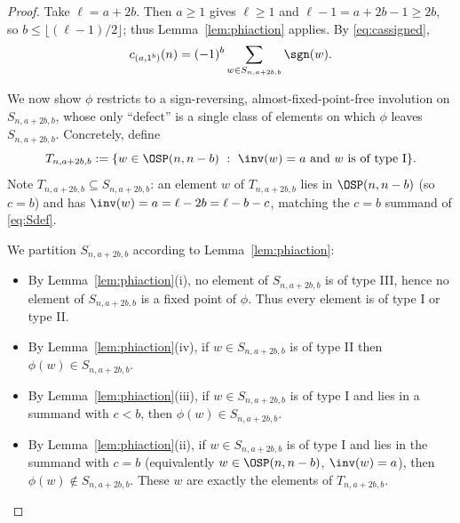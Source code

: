 \begin{proof}
Take $\ell=a+2b$. Then $a\ge1$ gives $\ell\ge1$ and $\ell-1=a+2b-1\ge 2b$, so
$b\le\lfloor(\ell-1)/2\rfloor$; thus Lemma~\ref{lem:phiaction} applies. By
\eqref{eq:cassigned},
\begin{equation}\label{eq:signedsum}
c_{(a,1^b)}(n)=(-1)^b\sum_{w\in S_{n,a+2b,b}}\sgn(w).
\end{equation}

We now show $\phi$ restricts to a sign-reversing, almost-fixed-point-free involution on
$S_{n,a+2b,b}$, whose only ``defect'' is a single class of elements on which $\phi$ leaves
$S_{n,a+2b,b}$. Concretely, define
\begin{equation}\label{eq:Tdef}
T_{n,a+2b,b}:=\{w\in\OSP(n,n-b)\ :\ \inv(w)=a\ \text{and}\ w\ \text{is of type I}\}.
\end{equation}
Note $T_{n,a+2b,b}\subseteq S_{n,a+2b,b}$: an element $w$ of $T_{n,a+2b,b}$ lies in
$\OSP(n,n-b)$ (so $c=b$) and has $\inv(w)=a=\ell-2b=\ell-b-c$, matching the $c=b$ summand of
\eqref{eq:Sdef}.

We partition $S_{n,a+2b,b}$ according to Lemma~\ref{lem:phiaction}:
\begin{itemize}
\item By Lemma~\ref{lem:phiaction}(i), no element of $S_{n,a+2b,b}$ is of type III, hence no
element of $S_{n,a+2b,b}$ is a fixed point of $\phi$. Thus every element is of type I or
type II.
\item By Lemma~\ref{lem:phiaction}(iv), if $w\in S_{n,a+2b,b}$ is of type II then
$\phi(w)\in S_{n,a+2b,b}$.
\item By Lemma~\ref{lem:phiaction}(iii), if $w\in S_{n,a+2b,b}$ is of type I and lies in a
summand with $c<b$, then $\phi(w)\in S_{n,a+2b,b}$.
\item By Lemma~\ref{lem:phiaction}(ii), if $w\in S_{n,a+2b,b}$ is of type I and lies in the
summand with $c=b$ (equivalently $w\in\OSP(n,n-b)$, $\inv(w)=a$), then
$\phi(w)\notin S_{n,a+2b,b}$. These $w$ are exactly the elements of $T_{n,a+2b,b}$.
\end{itemize}


\end{proof}
